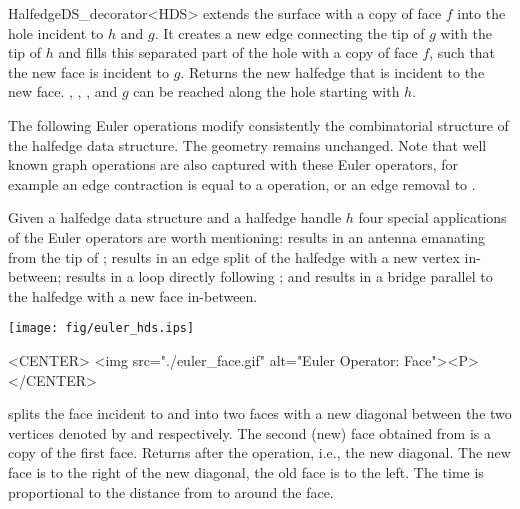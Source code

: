 \begin{ccRefClass}{HalfedgeDS_decorator<HDS>}
   {extends the surface with a copy of face $f$ into the hole 
    incident to $h$ and $g$. It creates a new edge connecting the tip of
    $g$ with the tip of $h$ and fills this separated part of the hole with a
    copy of face $f$, such that the new face is incident to $g$. Returns 
    the new halfedge that is incident to the new face.
    \ccPrecond {}, ,
    ,  and $g$ can be reached 
    along the hole starting with $h$.}



The following Euler operations modify consistently the combinatorial
structure of the halfedge data structure. The geometry remains unchanged.
Note that well known graph operations are also captured with these 
Euler operators, for example an edge contraction is equal to a
 operation, or an edge removal to .

Given a halfedge data structure  and a halfedge handle $h$
four special applications of the Euler operators are worth mentioning:
 results in an antenna emanating from the tip
of ;  results in an edge 
split of the halfedge  with a new vertex in-between;
 results in a loop directly following ;
and  results in a bridge parallel to
the halfedge  with a new face in-between.

\begin{ccTexOnly}
    \begin{center}
      \parbox{\textwidth}{%
          \texttt{[image: fig/euler\_hds.ips]}%
      }
    \end{center}
\end{ccTexOnly}

\begin{ccHtmlOnly}
    <CENTER>
    <img src="./euler_face.gif" alt="Euler Operator: Face"><P>
    </CENTER>
\end{ccHtmlOnly}

    {splits the face incident to  and  into two faces
     with a new diagonal between the two vertices denoted by  and
      respectively. The second (new) face obtained from
      is a copy of the first face. Returns  after the
     operation, i.e., the new diagonal. The new face is to the right of the 
     new diagonal, the old face is to the left. The time is proportional 
     to the distance from  to  around the face.} 


\end{ccRefClass}
